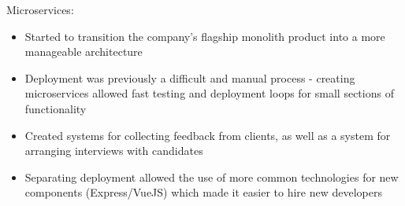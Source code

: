 \item Microservices:
\begin{itemize}%
    \item Started to transition the company's flagship monolith product into a more manageable architecture
    \item Deployment was previously a difficult and manual process - creating microservices allowed fast testing and deployment loops for small sections of functionality
    \item Created systems for collecting feedback from clients, as well as a system for arranging interviews with candidates
    \item Separating deployment allowed the use of more common technologies for new components (Express/VueJS) which made it easier to hire new developers
\end{itemize}
